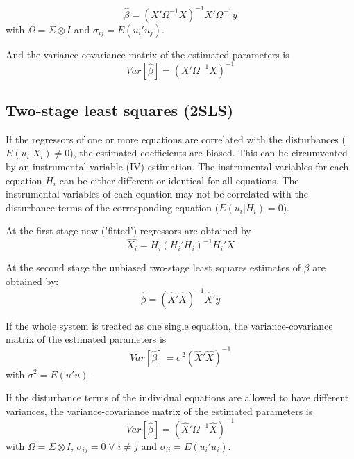 \begin{equation}
   \widehat{\beta} = \left( X' \Omega^{-1} X \right)^{-1} X' \Omega^{-1} y
\end{equation}
with $\Omega = \Sigma \otimes I$ and
$\sigma_{ij} = E \left( u_i' u_j \right)$.

And the variance-covariance matrix of the estimated parameters is
\begin{equation}
   Var \left[ \widehat{\beta} \right] = \left( X' \Omega^{-1} X \right)^{-1}
\end{equation}


\subsection{Two-stage least squares (2SLS)}

If the regressors of one or more equations are correlated 
with the disturbances ($E \left( u_i | X_i \right) \neq 0$), 
the estimated coefficients are biased.
This can be circumvented by an instrumental variable (IV) estimation.
The instrumental variables for each equation $H_i$ 
can be either different or identical for all equations.
The instrumental variables of each equation may not be correlated with 
the disturbance terms of the corresponding equation 
($E \left( u_i | H_i \right) = 0$).

At the first stage new ('fitted') regressors are obtained by
\begin{equation}
   \widehat{X_i} = H_i \left( H_i' H_i \right)^{-1} H_i' X
\end{equation}

At the second stage the unbiased two-stage least squares estimates
of $\beta$ are obtained by:
\begin{equation}
   \widehat{\beta} = \left( \widehat{X}' \widehat{X} \right)^{-1} 
   \widehat{X}' y 
   \label{eq:beta2sls}
\end{equation}

If the whole system is treated as one single equation, 
the variance-covariance matrix of the estimated parameters is
\begin{equation}
   Var \left[ \widehat{\beta} \right] = \sigma^2 \left( \widehat{X}'
   \widehat{X} \right)^{-1}
\end{equation}
with $\sigma^2 = E \left( u' u \right)$.

If the disturbance terms of the individual equations 
are allowed to have different variances, 
the variance-covariance matrix of the estimated parameters is
\begin{equation}
   Var \left[ \widehat{\beta} \right] = \left( \widehat{X}' \Omega^{-1} 
   \widehat{X} \right)^{-1}
\end{equation}
with $\Omega = \Sigma \otimes I$, 
$\sigma_{ij} = 0 \; \forall \; i \neq j$ and
$\sigma_{ii} = E \left( u_i' u_i \right)$.


